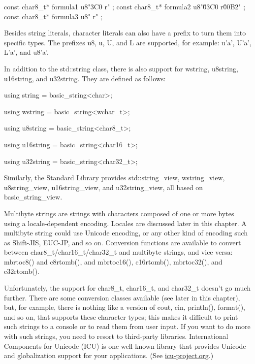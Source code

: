 \begin{cpp}
const char8_t* formula1 { u8"\x3C0 r" };
const char8_t* formula2 { u8"\u03C0 r\u00B2" };
const char8_t* formula3 { u8" r" };
\end{cpp}

Besides string literals, character literals can also have a prefix to turn them into specific types. The prefixes u8, u, U, and L are supported, for example: u'a', U'a', L'a', and u8'a'.

In addition to the std::string class, there is also support for wstring, u8string, u16string, and u32string. They are defined as follows:

\begin{cpp}
using string = basic_string<char>;
\end{cpp}

\begin{cpp}
using wstring = basic_string<wchar_t>;
\end{cpp}

\begin{cpp}
using u8string = basic_string<char8_t>;
\end{cpp}

\begin{cpp}
using u16string = basic_string<char16_t>;
\end{cpp}

\begin{cpp}
using u32string = basic_string<char32_t>;
\end{cpp}

Similarly, the Standard Library provides std::string\_view, wstring\_view, u8string\_view, u16string\_view, and u32string\_view, all based on basic\_string\_view.

Multibyte strings are strings with characters composed of one or more bytes using a locale-dependent encoding. Locales are discussed later in this chapter. A multibyte string could use Unicode encoding, or any other kind of encoding such as Shift-JIS, EUC-JP, and so on. Conversion functions are available to convert between char8\_t/char16\_t/char32\_t and multibyte strings, and vice versa: mbrtoc8() and c8rtomb(), and mbrtoc16(), c16rtomb(), mbrtoc32(), and c32rtomb().

Unfortunately, the support for char8\_t, char16\_t, and char32\_t doesn’t go much further. There are some conversion classes available (see later in this chapter), but, for example, there is nothing like a version of cout, cin, println(), format(), and so on, that supports these character types; this makes it difficult to print such strings to a console or to read them from user input. If you want to do more with such strings, you need to resort to third-party libraries. International Components for Unicode (ICU) is one well-known library that provides Unicode and globalization support for your applications. (See \url{icu-project.org}.)

